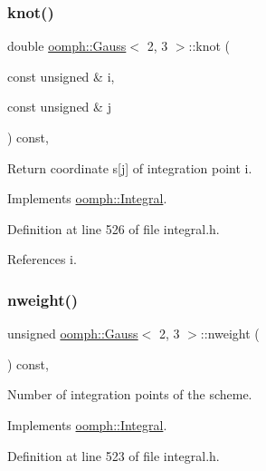 \subsubsection{\texorpdfstring{knot()}{knot()}}
{\footnotesize\ttfamily double \hyperlink{classoomph_1_1Gauss}{oomph\+::\+Gauss}$<$ 2, 3 $>$\+::knot (\begin{DoxyParamCaption}\item[{const unsigned \&}]{i,  }\item[{const unsigned \&}]{j }\end{DoxyParamCaption}) const\hspace{0.3cm}{\ttfamily [inline]}, {\ttfamily [virtual]}}



Return coordinate s\mbox{[}j\mbox{]} of integration point i. 



Implements \hyperlink{classoomph_1_1Integral_a1a2122f99a87c18649bafdd9ed739758}{oomph\+::\+Integral}.



Definition at line 526 of file integral.\+h.



References i.

\mbox{\label{classoomph_1_1Gauss_3_012_00_013_01_4_ae4d1b897bcede6458f61099327be63ef}} 
\subsubsection{\texorpdfstring{nweight()}{nweight()}}
{\footnotesize\ttfamily unsigned \hyperlink{classoomph_1_1Gauss}{oomph\+::\+Gauss}$<$ 2, 3 $>$\+::nweight (\begin{DoxyParamCaption}{ }\end{DoxyParamCaption}) const\hspace{0.3cm}{\ttfamily [inline]}, {\ttfamily [virtual]}}



Number of integration points of the scheme. 



Implements \hyperlink{classoomph_1_1Integral_a1a270de9d99a1fcf1d25a6c1017f65fa}{oomph\+::\+Integral}.



Definition at line 523 of file integral.\+h.

